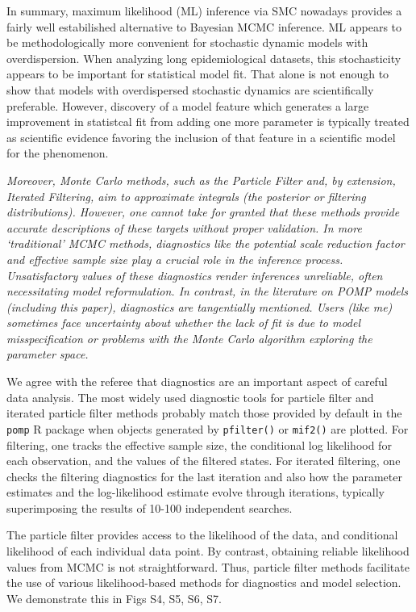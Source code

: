\documentclass[11pt]{article}
\newcommand\code[1]{\texttt{#1}}
\newcommand\report[1]{{\color{mygreen} \vspace{1mm}\hspace{0.25in}\parbox{6in}{\em #1}}}
\begin{document}
In summary, maximum likelihood (ML) inference via SMC nowadays provides a fairly well estabilished alternative to Bayesian MCMC inference. ML appears to be methodologically more convenient for stochastic dynamic models with overdispersion. When analyzing long epidemiological datasets, this stochasticity appears to be important for statistical model fit. That alone is not enough to show that models with overdispersed stochastic dynamics are scientifically preferable. However, discovery of a  model feature which generates a large improvement in statistcal fit from adding one more parameter is typically treated as scientific evidence favoring the inclusion of that feature in a scientific model for the phenomenon.

\report{
Moreover, Monte Carlo methods, such as the Particle Filter and, by extension, Iterated Filtering, aim to approximate integrals (the posterior or filtering distributions). However, one cannot take for granted that these methods provide accurate descriptions of these targets without proper validation. In more ‘traditional’ MCMC methods, diagnostics like the potential scale reduction factor and effective sample size play a crucial role in the inference process. Unsatisfactory values of these diagnostics render inferences unreliable, often necessitating model reformulation. In contrast, in the literature on POMP models (including this paper), diagnostics are tangentially mentioned. Users (like me) sometimes face uncertainty about whether the lack of fit is due to model misspecification or problems with the Monte Carlo algorithm exploring the parameter space.
}

We agree with the referee that diagnostics are an important aspect of careful data analysis.
The most widely used diagnostic tools for particle filter and iterated particle filter methods probably match those provided by default in the \code{pomp} R package \cite{king16} when objects generated by \code{pfilter()} or \code{mif2()} are plotted.
For filtering, one tracks the effective sample size, the conditional log likelihood for each observation, and the values of the filtered states.
For iterated filtering, one checks the filtering diagnostics for the last iteration and also how the parameter estimates and the log-likelihood estimate evolve through iterations, typically superimposing the results of 10-100 independent searches.

The particle filter provides access to the likelihood of the data, and conditional likelihood of each individual data point.
By contrast, obtaining reliable likelihood values from MCMC is not straightforward.
Thus, particle filter methods facilitate the use of various likelihood-based methods for diagnostics and model selection.
We demonstrate this in Figs S4, S5, S6, S7. 
\end{document}
